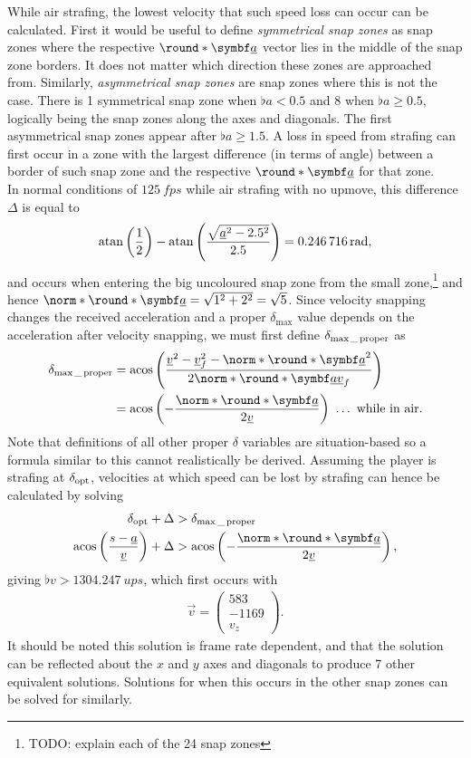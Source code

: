 While air strafing, the lowest velocity that such speed loss can occur can be calculated. First it would be useful to define \emph{symmetrical snap zones} as snap zones where the respective $\round*{\vec{\flat{a}}}$ vector lies in the middle of the snap zone borders. It does not matter which direction these zones are approached from. Similarly, \emph{asymmetrical snap zones} are snap zones where this is not the case.
There is 1 symmetrical snap zone when $\flat{a} < 0.5$ and 8 when $\flat{a}\ge 0.5$, logically being the snap zones along the axes and diagonals. The first asymmetrical snap zones appear after $\flat{a}\ge 1.5$.
A loss in speed from strafing can first occur in a zone with the largest difference (in terms of angle) between a border of such snap zone and the respective $\round*{\vec{\flat{a}}}$ for that zone.\\

In normal conditions of $\qty{125}{fps}$ while air strafing with no upmove, this difference $\Delta$ is equal to
\begin{align*}
\atan\left(\frac{1}{2} \right) - \atan\left(\frac{\sqrt{\flat{a}^2 - 2.5^2}}{2.5} \right) = \qty{0.246716}{rad},
\end{align*}
and occurs when entering the big uncoloured snap zone from the small zone,\footnote{TODO: explain each of the 24 snap zones} and hence $\norm*{\round*{\vec{\flat{a}}}} = \sqrt{1^2 + 2^2} = \sqrt{5}$. Since velocity snapping changes the received acceleration and a proper $\delta_{\max}$ value depends on the acceleration after velocity snapping, we must first define $\delta_{\max\_\operatorname{proper}}$ as
\begin{align}
\delta_{\max\_\proper} &= \acos\left(\frac{\flat{v}^2 - \flat{v}_f^2 - \norm*{\round*{\vec{\flat{a}}}}^2}{2\norm*{\round*{\vec{\flat{a}}}}\flat{v}_f} \right)\\\nonumber
&= \acos\left(-\frac{\norm*{\round*{\vec{\flat{a}}}}}{2\flat{v}} \right)\ \ldots\ \text{while in air.}
\end{align}
Note that definitions of all other proper $\delta$ variables are situation-based so a formula similar to this cannot realistically be derived.
Assuming the player is strafing at $\delta_{\operatorname{opt}}$, velocities at which speed can be lost by strafing can hence be calculated by solving
\begin{align*}
\delta_{\opt} + \Delta &> \delta_{\max\_\proper}\\
\acos\left(\frac{s - \flat{a}}{\flat{v}} \right) + \Delta &> \acos\left(-\frac{\norm*{\round*{\vec{\flat{a}}}}}{2\flat{v}} \right),
\end{align*}
giving $\flat{v} > \qty{1304.247}{ups}$, which first occurs with
\begin{align*}
\vec{v} =
\begin{pmatrix}
583 \\ -1169 \\ v_z
\end{pmatrix}.
\end{align*}
It should be noted this solution is frame rate dependent, and that the solution can be reflected about the $x$ and $y$ axes and diagonals to produce 7 other equivalent solutions.
Solutions for when this occurs in the other snap zones can be solved for similarly.


